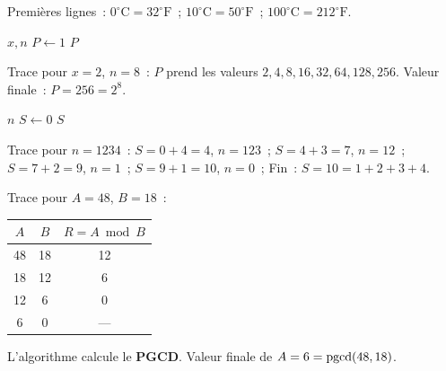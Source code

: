 \begin{algorithm}[H]
\caption{Tableau Celsius/Fahrenheit}
\end{algorithm}

Premi\`eres lignes~: $0^{\circ}\text{C}=32^{\circ}\text{F}$~;
$10^{\circ}\text{C}=50^{\circ}\text{F}$~; $100^{\circ}\text{C}=212^{\circ}\text{F}$.


\begin{algorithm}[H]
\caption{$x^n$ par multiplications}
\Lire $x, n$\;
$P \leftarrow 1$\;
\Afficher $P$\;
\end{algorithm}

Trace pour $x=2$, $n=8$~: $P$ prend les valeurs $2,4,8,16,32,64,128,256$.
Valeur finale~: $P=256=2^8$.\checkmark


\begin{algorithm}[H]
\caption{Somme des chiffres}
\Lire $n$\;
$S \leftarrow 0$\;
\Afficher $S$\;
\end{algorithm}

Trace pour $n=1234$~:
$S=0+4=4$, $n=123$~;
$S=4+3=7$, $n=12$~;
$S=7+2=9$, $n=1$~;
$S=9+1=10$, $n=0$~;
Fin~: $S=10=1+2+3+4$.\checkmark


Trace pour $A=48$, $B=18$~:
\begin{center}
\renewcommand{\arraystretch}{1.25}
\begin{tabular}{ccc}
\toprule
$A$ & $B$ & $R = A\bmod B$ \\
\midrule
48 & 18 & 12 \\
18 & 12 & 6 \\
12 & 6 & 0 \\
6 & 0 & — \\
\bottomrule
\end{tabular}
\end{center}
L'algorithme calcule le \textbf{PGCD}. Valeur finale de $A=6=\operatorname{pgcd}(48,18)$.


